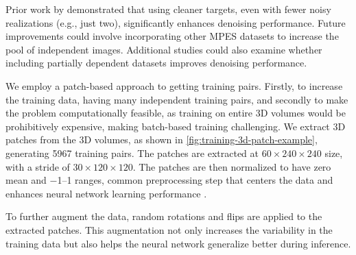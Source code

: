Prior work by \citeauthor{lehtinenNoise2NoiseLearningImage2018} demonstrated that using cleaner targets, even with fewer noisy realizations (e.g., just two), significantly enhances denoising performance. Future improvements could involve incorporating other \gls{MPES} datasets to increase the pool of independent images. Additional studies could also examine whether including partially dependent datasets improves denoising performance.

We employ a patch-based approach to getting training pairs. Firstly, to increase the training data, having many independent training pairs, and secondly to make the problem computationally feasible, as training on entire 3D volumes would be prohibitively expensive, making batch-based training challenging. We extract 3D patches from the 3D volumes, as shown in \cref{fig:training-3d-patch-example}, generating \num{5967} training pairs. The patches are extracted at $60 \times 240 \times 240$ size, with a stride of $30 \times 120 \times 120$. The patches are then normalized to have zero mean and \numrange{-1}{1} ranges, common preprocessing step that centers the data and enhances neural network learning performance \cite{bishopDeepLearningFoundations2024}. 

To further augment the data, random rotations and flips are applied to the extracted patches. This augmentation not only increases the variability in the training data but also helps the neural network generalize better during inference.

